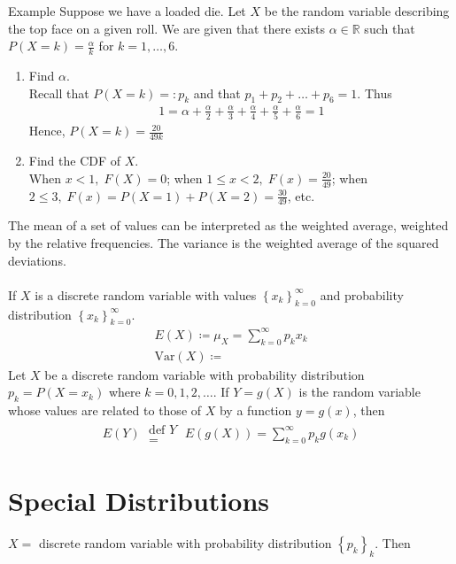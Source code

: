 \documentclass{report}
\begin{document}
\begin{enumerate}
	\begin{question}{Example}
		Suppose we have a loaded die. Let $X$ be the random variable describing the top face on a given roll. We are given that there exists $\alpha \in \mathbb{R}$ such that $P(X = k) = \frac{\alpha}{k}$ for $k = 1,\dots,6$.
		\begin{enumerate}
			\item Find $\alpha$.	\\
				Recall that $P(X = k) =: p_k$ and that $p_1 + p_2 + \dots + p_6 = 1$. Thus
				\begin{align*}
					1 = \alpha + \frac{\alpha}{2} + \frac{\alpha}{3} + \frac{\alpha}{4} + \frac{\alpha}{5} + \frac{\alpha}{6} = 1
				\end{align*}
				Hence, $P(X = k) = \frac{20}{49k}$
			\item Find the CDF of $X$.	\\
				When $x < 1,\;  F(X) = 0$; when $1 \leq x < 2,\; F(x) = \frac{20}{49}$; when $2 \leq 3,\; F(x) = P(X = 1) + P(X = 2) = \frac{30}{49}$, etc.
		\end{enumerate}
	\end{question}
	The mean of a set of values can be interpreted as the weighted average, weighted by the relative frequencies. The variance is the weighted average of the squared deviations.
	\\ \\
	If $X$ is a discrete random variable with values $\left\{x_k\right\}_{k=0}^\infty$ and probability distribution $\left\{x_k\right\}_{k=0}^\infty$. 
	\begin{align*}
		E(X) \coloneq \mu_X = \sum_{k=0}^\infty p_kx_k	\\
		\text{Var}(X) \coloneq
	\end{align*}
	Let $X$ be a discrete random variable with probability distribution $p_k= P(X = x_k)$ where $k = 0,1,2,\dots$. If $Y = g(X)$ is the random variable whose values are related to those of $X$ by a function $y = g(x)$, then
	\begin{align*}
		E(Y) \; \substack{\text{def $Y$}\\=} \; E(g(X)) = \sum_{k=0}^\infty p_kg(x_k)
	\end{align*}

\chapter{Special Distributions}

	$X = $ discrete random variable with probability distribution $\left\{p_k\right\}_k$. Then


\end{enumerate}
\end{document}
